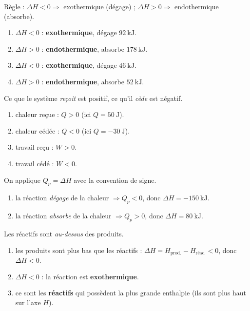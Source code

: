 \documentclass[11pt,a4paper]{article}
\begin{document}
\begin{corrige}
Règle : $\Delta H<0 \Rightarrow$ exothermique (dégage) ; $\Delta H>0 \Rightarrow$ endothermique (absorbe).
\begin{enumerate}[label=\alph*)]
  \item $\Delta H<0$ : \textbf{exothermique}, dégage $\qty{92}{\kilo\joule}$.
  \item $\Delta H>0$ : \textbf{endothermique}, absorbe $\qty{178}{\kilo\joule}$.
  \item $\Delta H<0$ : \textbf{exothermique}, dégage $\qty{46}{\kilo\joule}$.
  \item $\Delta H>0$ : \textbf{endothermique}, absorbe $\qty{52}{\kilo\joule}$.
\end{enumerate}
\end{corrige}

\begin{corrige}
Ce que le système \emph{reçoit} est positif, ce qu'il \emph{cède} est négatif.
\begin{enumerate}[label=\alph*)]
  \item chaleur reçue : $Q>0$ (ici $Q=\qty{+50}{\joule}$).
  \item chaleur cédée : $Q<0$ (ici $Q=\qty{-30}{\joule}$).
  \item travail reçu : $W>0$.
  \item travail cédé : $W<0$.
\end{enumerate}
\end{corrige}

\begin{corrige}
On applique $Q_p=\Delta H$ avec la convention de signe.
\begin{enumerate}[label=\alph*)]
  \item la réaction \emph{dégage} de la chaleur $\Rightarrow Q_p<0$, donc $\Delta H = \qty{-150}{\kilo\joule}$.
  \item la réaction \emph{absorbe} de la chaleur $\Rightarrow Q_p>0$, donc $\Delta H = \qty{+80}{\kilo\joule}$.
\end{enumerate}
\end{corrige}

\begin{corrige}
Les réactifs sont \emph{au-dessus} des produits.
\begin{enumerate}[label=\alph*)]
  \item les produits sont plus bas que les réactifs : $\Delta H = H_{\text{prod.}}-H_{\text{réac.}}<0$, donc $\Delta H<0$.
  \item $\Delta H<0$ : la réaction est \textbf{exothermique}.
  \item ce sont les \textbf{réactifs} qui possèdent la plus grande enthalpie (ils sont plus haut sur l'axe $H$).
\end{enumerate}
\end{corrige}
\end{document}
